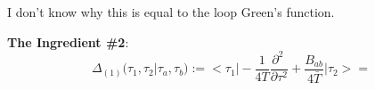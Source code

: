 \begin{description}
I don't know why this is equal to the loop Green's function.

{\bf The Ingredient \#2}:
\[
\Delta_{(1)}(\tau_1,\tau_2|\tau_a,\tau_b)
:=<\tau_1|-\frac{1}{4T}\frac{\partial^2~}{\partial\tau^2}+\frac{B_{ab}}{4\bar{T}}|\tau_2>
=
\]






\end{description}

\printbibliography[heading=subbibintoc,title={References}]


\renewcommand{\ssp}{a}
